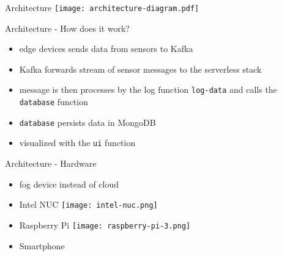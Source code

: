 \begin{frame}{Architecture}
  \centering
  \vfill
  \texttt{[image: architecture-diagram.pdf]}
\end{frame}

\begin{frame}{Architecture - How does it work?}
  \begin{itemize}
    \item edge devices sends data from sensors to Kafka
    \item Kafka forwards stream of sensor messages to the serverless stack
    \item message is then processes by the log function \lstinline{log-data} and calls the \lstinline{database} function
    \item \lstinline{database} persists data in MongoDB
    \item visualized with the \lstinline{ui} function
  \end{itemize}
\end{frame}

\begin{frame}{Architecture - Hardware}
  \begin{itemize}
    \item fog device instead of cloud
    \item Intel NUC
          \hspace*{13.5em}
          \texttt{[image: intel-nuc.png]}
    \item Raspberry Pi
          \hspace*{13.5em}
          \texttt{[image: raspberry-pi-3.png]}
    \item Smartphone
  \end{itemize}
\end{frame}
